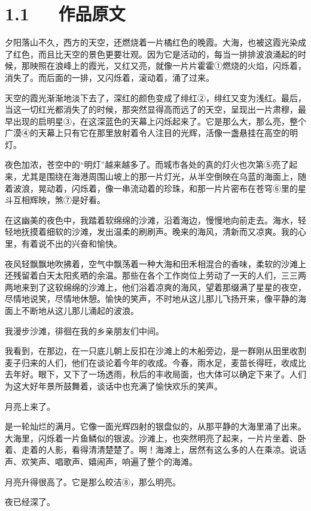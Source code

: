 \documentclass[letterpaper,12pt,english]{sphinxmanual}
\begin{document}
\section{1.1   作品原文}
\label{\detokenize{p01_u6563_u6587/_u5cfb_u9752-_u6d77_u6ee8_u4ef2_u590f_u591c:id3}}
夕阳落山不久，西方的天空，还燃烧着一片橘红色的晚霞。大海，也被这霞光染成了红色，而且比天空的景色更要壮观。因为它是活动的，每当一排排波浪涌起的时候，那映照在浪峰上的霞光，又红又亮，就像一片片霍霍①燃烧的火焰，闪烁着，消失了。而后面的一排，又闪烁着，滚动着，涌了过来。

天空的霞光渐渐地淡下去了，深红的颜色变成了绯红②，绯红又变为浅红。最后，当这一切红光都消失了的时候，那突然显得高而远了的天空，呈现出一片肃穆，最早出现的启明星③，在这深蓝色的天幕上闪烁起来了。它是那么大，那么亮，整个广漠④的天幕上只有它在那里放射着令人注目的光辉，活像一盏悬挂在高空的明灯。

夜色加浓，苍空中的“明灯”越来越多了。而城市各处的真的灯火也次第⑤亮了起来，尤其是围绕在海港周围山坡上的那一片灯光，从半空倒映在乌蓝的海面上，随着波浪，晃动着，闪烁着，像一串流动着的珍珠，和那一片片密布在苍穹⑥里的星斗互相辉映，煞⑦是好看。

在这幽美的夜色中，我踏着软绵绵的沙滩，沿着海边，慢慢地向前走去。海水，轻轻地抚摸着细软的沙滩，发出温柔的刷刷声。晚来的海风，清新而又凉爽。我的心里，有着说不出的兴奋和愉快。

夜风轻飘飘地吹拂着，空气中飘荡着一种大海和田禾相混合的香味，柔软的沙滩上还残留着白天太阳炙晒的余温。那些在各个工作岗位上劳动了一天的人们，三三两两地来到了这软绵绵的沙滩上，他们浴着凉爽的海风，望着那缀满了星星的夜空，尽情地说笑，尽情地休憩。愉快的笑声，不时地从这儿那儿飞扬开来，像平静的海面上不断地从这儿那儿涌起的波浪。

我漫步沙滩，徘徊在我的乡亲朋友们中间。

我看到，在那边，在一只底儿朝上反扣在沙滩上的木船旁边，是一群刚从田里收割麦子归来的人们，他们在谈论着今年的收成。今春，雨水足，麦苗长得旺，收成比去年好。眼下，又下了一场透雨，秋后的丰收局面，也大体可以确定下来了。人们为这大好年景所鼓舞着，谈话中也充满了愉快欢乐的笑声。

月亮上来了。

是一轮灿烂的满月。它像一面光辉四射的银盘似的，从那平静的大海里涌了出来。大海里，闪烁着一片鱼鳞似的银波。沙滩上，也突然明亮了起来，一片片坐着、卧着、走着的人影，看得清清楚楚了。啊！海滩上，居然有这么多的人在乘凉。说话声、欢笑声、唱歌声、嬉闹声，响遍了整个的海滩。

月亮升得很高了。它是那么皎洁⑧，那么明亮。

夜已经深了。
\end{document}
